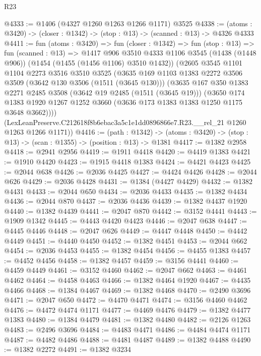 \begin{lexlean}{R23}
\begin{coremodule}
@4333 := @1406 (@4327 @1260 @1263 @1266 @1171) @3525
@4338 := (atoms : @3420) -> (closer : @1342) -> (stop : @13) -> (scanned : @13) -> @4326 @4333
@4411 := fun (atoms : @3420) =>
  fun (closer : @1342) =>
  fun (stop : @13) =>
  fun (scanned : @13) =>
  @1417
    @906
    @3510
    @4333
    @1106
    @3545
    (@1438 (@1448 @906))
    (@1454 (@1455 (@1456 @1106) @3510 @1432))
    (@2605
      @3545
      @1101
      @1104
      @2273
      @3516
      @3510
      @3525
      (@3635
        @169
        @1103
        @1383
        @2272
        @3506
        @3509
        (@3642 @130 @3506 (@1511 (@3645 @130)))
        (@3635
          @167
          @350
          @1383
          @2271
          @2485
          @3508
          (@3642 @19 @2485 (@1511 (@3645 @19)))
          (@3650
            @174
            @1383
            @1920
            @1267
            @1252
            @3660
            (@3636 @173 @1383 @1383 @1250 @1175 @3648 @3662))))
      (LexLeanPreserve.C212618f8b6ebac3a5c1e1dd0896866e7.R23.__rel_21 @1260 @1263 @1266 @1171))
@4416 := (path : @1342) ->
  (atoms : @3420) -> (stop : @13) -> (scan : @1355) -> (position : @13) -> @1381
@4417 := @1382 @2958
@4418 := @2941 @2956
@4419 := @1911 @4418
@4420 := @4419 @1383
@4421 := @1910 @4420
@4423 := @1915 @4418 @1383
@4424 := @4421 @4423
@4425 := @2044 @638
@4426 := @2036 @4425
@4427 := @4424 @4426
@4428 := @2044 @626
@4429 := @2036 @4428
@4431 := @1384 (@4427 @4429)
@4432 := @1382 @4431
@4433 := @2044 @650
@4434 := @2036 @4433
@4435 := @1382 @4434
@4436 := @2044 @870
@4437 := @2036 @4436
@4439 := @1382 @4437 @1920
@4440 := @1382 @4439
@4441 := @2047 @870
@4442 := @3152 @4441
@4443 := @1909 @1342
@4445 := @4443 @4420 @4423
@4446 := @2047 @638
@4447 := @4445 @4446
@4448 := @2047 @626
@4449 := @4447 @4448
@4450 := @4442 @4449
@4451 := @4440 @4450
@4452 := @1382 @4451
@4453 := @2044 @662
@4454 := @2036 @4453
@4455 := @1382 @4454
@4456 := @4455 @1383
@4457 := @4452 @4456
@4458 := @1382 @4457
@4459 := @3156 @4441
@4460 := @4459 @4449
@4461 := @3152 @4460
@4462 := @2047 @662
@4463 := @4461 @4462
@4464 := @4458 @4463
@4466 := @1382 @4464 @1920
@4467 := @4435 @4466
@4468 := @1384 @4467
@4469 := @1382 @4468
@4470 := @2490 @3696
@4471 := @2047 @650
@4472 := @4470 @4471
@4474 := @3156 @4460 @4462
@4476 := @4472 @4474 @1171
@4477 := @4469 @4476
@4479 := @1382 @4477 @1383
@4480 := @1384 @4479
@4481 := @1382 @4480
@4482 := @2126 @1263
@4483 := @2496 @3696
@4484 := @4483 @4471
@4486 := @4484 @4474 @1171
@4487 := @4482 @4486
@4488 := @4481 @4487
@4489 := @1382 @4488
@4490 := @1382 @2272
@4491 := @1382 @3234

\end{coremodule}
\end{lexlean}
